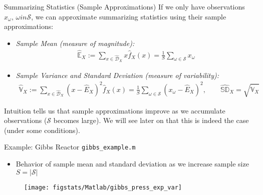 \documentclass[handout,9pt]{beamer}
\begin{document}
%
\begin{frame}{Summarizing Statistics (Sample Approximations)}
If we only have observations $x_\omega,\,\omega in \mathcal{S}$, we can approximate summarizing statistics using their sample approximations: 
\begin{block}{}
\begin{itemize}
\item {\em Sample Mean (measure of magnitude):} 
\begin{align*}
\hat{\mathbb{E}}_X:=\sum_{x\in \hat{\mathcal{D}}_X}x\hat{f}_X(x)=\frac{1}{S}\sum_{\omega\in \mathcal{S}}x_\omega
\end{align*}
\item {\em Sample Variance and Standard Deviation (measure of variability):} 
\begin{align*}
\hat{\mathbb{V}}_X:=\sum_{x\in \hat{\mathcal{D}}_X}(x-\hat{E}_X)^2\hat{f}_X(x)=\frac{1}{S}\sum_{\omega\in \mathcal{S}}(x_\omega-\hat{E}_X)^2,\qquad \hat{\mathbb{SD}}_X=\sqrt{\hat{\mathbb{V}}_X}
\end{align*}
\end{itemize}
\end{block}
Intuition tells us that sample approximations improve as we accumulate observations ($\mathcal{S}$ becomes large). We will see later on that this is indeed the case (under some conditions). 
\end{frame}

\begin{frame}{Example: Gibbs Reactor \footnotesize{\texttt{gibbs\_example.m}}}
\begin{itemize}
\item Behavior of sample mean and standard deviation as we increase sample size $S=|\mathcal{S}|$
\end{itemize}
\begin{figure}[!htb]
    \centering
	\texttt{[image: figstats/Matlab/gibbs\_press\_exp\_var]}
\end{figure}

\end{frame}
\end{document}
